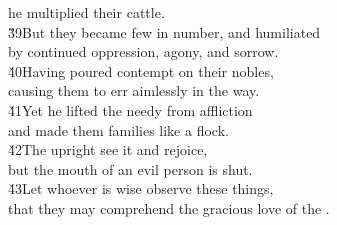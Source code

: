 \begin{poetry}
\poemll    he multiplied their cattle. \\
\poeml \v{39}But they became few in number, and humiliated \\
\poemll    by continued oppression, agony, and sorrow. \\
\poeml \v{40}Having poured contempt on their nobles, \\
\poemll    causing them to err aimlessly in the way. \\
\poeml \v{41}Yet he lifted the needy from affliction \\
\poemll    and made them families like a flock. \\
\poeml \v{42}The upright see it and rejoice, \\
\poemll    but the mouth of an evil person is shut. \\
\poeml \v{43}Let whoever is wise observe these things, \\
\poemll    that they may comprehend the gracious love of the .
\end{poetry}

